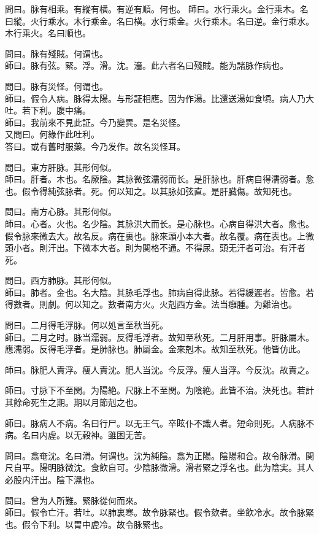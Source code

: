\documentclass[b5paper,twoside,zihao=-4,UTF8]{ctexbook}
\begin{document}
問曰。脉有相乘。有縱有横。有逆有順。何也。
師曰。水行乘火。金行乘木。名曰縱。火行乘水。木行乘金。名曰横。水行乘金。火行乘木。名曰逆。金行乘水。木行乘火。名曰順也。

問曰。脉有殘賊。何谓也。\\
師曰。脉有弦。緊。浮。滑。沈。濇。此六者名曰殘賊。能为諸脉作病也。

問曰。脉有災怪。何谓也。\\
師曰。假令人病。脉得太陽。与形証相應。因为作湯。比還送湯如食頃。病人乃大吐。若下利。腹中痛。\\
師曰。我前來不見此証。今乃變異。是名災怪。\\
又問曰。何緣作此吐利。\\
答曰。或有舊时服藥。今乃发作。故名災怪耳。

問曰。東方肝脉。其形何似。\\
師曰。肝者。木也。名厥陰。其脉微弦濡弱而长。是肝脉也。肝病自得濡弱者。愈也。假令得純弦脉者。死。何以知之。以其脉如弦直。是肝臓傷。故知死也。

問曰。南方心脉。其形何似。\\
師曰。心者。火也。名少陰。其脉洪大而长。是心脉也。心病自得洪大者。愈也。假令脉來微去大。故名反。病在裏也。脉來頭小本大者。故名覆。病在表也。上微頭小者。則汗出。下微本大者。則为関格不通。不得尿。頭无汗者可治。有汗者死。

問曰。西方肺脉。其形何似。\\
師曰。肺者。金也。名大陰。其脉毛浮也。肺病自得此脉。若得緩遲者。皆愈。若得數者。則劇。何以知之。數者南方火。火剋西方金。法当癰腫。为難治也。

問曰。二月得毛浮脉。何以処言至秋当死。\\
師曰。二月之时。脉当濡弱。反得毛浮者。故知至秋死。二月肝用事。肝脉屬木。應濡弱。反得毛浮者。是肺脉也。肺屬金。金來剋木。故知至秋死。他皆仿此。

師曰。脉肥人責浮。瘦人責沈。肥人当沈。今反浮。瘦人当浮。今反沈。故責之。

師曰。寸脉下不至関。为陽絶。尺脉上不至関。为陰絶。此皆不治。決死也。若計其餘命死生之期。期以月節剋之也。

師曰。脉病人不病。名曰行尸。以无王气。卒眩仆不識人者。短命則死。人病脉不病。名曰内虗。以无穀神。雖困无苦。

問曰。翕奄沈。名曰滑。何谓也。沈为純陰。翕为正陽。陰陽和合。故令脉滑。関尺自平。陽明脉微沈。食飲自可。少陰脉微滑。滑者緊之浮名也。此为陰実。其人必股内汗出。陰下濕也。

問曰。曾为人所難。緊脉從何而來。\\
師曰。假令亡汗。若吐。以肺裏寒。故令脉緊也。假令欬者。坐飲冷水。故令脉緊也。假令下利。以胃中虗冷。故令脉緊也。
\end{document}
